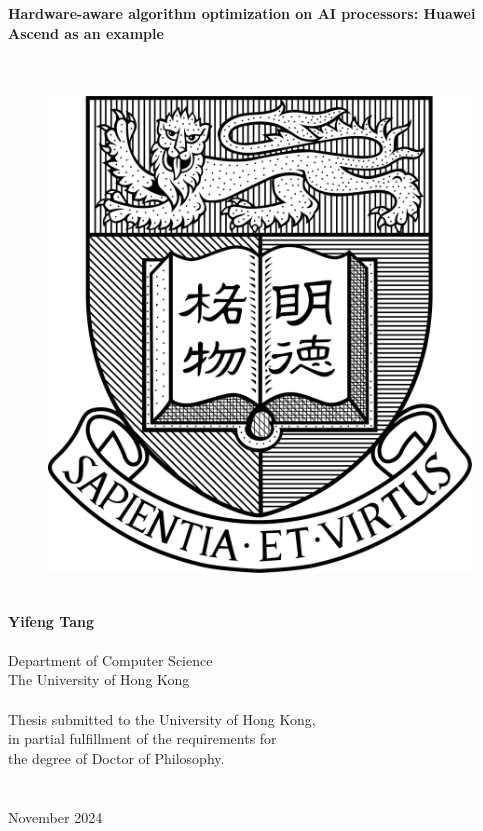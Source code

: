 \newpage
\thispagestyle{empty}
\centering

{\Large \bf 
    Hardware-aware algorithm optimization on AI processors: Huawei Ascend as an example
}\\
~\\
~\\
\begin{figure}[htbp]
    \centering
    \includegraphics[width=5 cm]{figures/logo.png}
    \label{fig:logo}
\end{figure}
~\\
{\bf \large Yifeng Tang}\\
~\\
Department of Computer Science\\
The University of Hong Kong\\
~\\
Thesis submitted to the University of Hong Kong,\\
in partial fulfillment of the requirements for\\
the degree of Doctor of Philosophy.\\
~\\
~\\
November 2024\\

\justifying